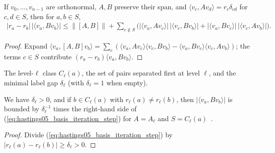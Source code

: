 \begin{lemma}
    \label{thm:hastings05_basis_iteration_step}
    \leanok
    If $v_0,\dots,v_{n-1}$ are orthonormal, $A,B$ preserve their span, and
    $\langle v_c,Av_d\rangle=r_c\delta_{cd}$ for $c,d\in S$, then for $a,b\in S$,
    \begin{align}
        |r_a-r_b|\,|\langle v_a,Bv_b\rangle|
        \le\|[A,B]\|+\sum_{c\notin S}\bigl(|\langle v_a,Av_c\rangle|\,
        |\langle v_c,Bv_b\rangle|+|\langle v_a,Bv_c\rangle|\,
        |\langle v_c,Av_b\rangle|\bigr).
        \label{eq:hastings05_basis_iteration_step}
    \end{align}
\end{lemma}
\begin{proof}\leanok
    Expand $\langle v_a,[A,B]v_b\rangle
        =\sum_c(\langle v_a,Av_c\rangle\langle v_c,Bv_b\rangle
        -\langle v_a,Bv_c\rangle\langle v_c,Av_b\rangle)$; the terms $c\in S$
    contribute $(r_a-r_b)\langle v_a,Bv_b\rangle$.
\end{proof}

\begin{definition}
    \label{def:hastings05_basis_iteration_levels}
    \leanok
    The level-$\ell$ class $C_\ell(a)$, the set of pairs separated first at
    level $\ell$, and the minimal label gap $\delta_\ell$ (with $\delta_\ell=1$
    when empty).
\end{definition}

\begin{lemma}
    \label{thm:hastings05_basis_iteration}
    \leanok
    We have $\delta_\ell>0$, and if $b\in C_\ell(a)$ with
    $r_\ell(a)\ne r_\ell(b)$, then $|\langle v_a,Bv_b\rangle|$ is bounded by
    $\delta_\ell^{-1}$ times the right-hand side of
    (\ref{eq:hastings05_basis_iteration_step}) for $A=A_\ell$ and
    $S=C_\ell(a)$~\cite{gap:hastings05_two_dim_ground_basis}.
\end{lemma}
\begin{proof}\leanok
    Divide (\ref{eq:hastings05_basis_iteration_step}) by
    $|r_\ell(a)-r_\ell(b)|\ge\delta_\ell>0$.
\end{proof}

